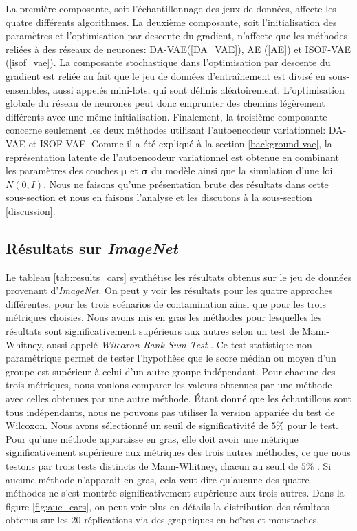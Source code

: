 La première composante, soit l'échantillonnage des jeux de données, affecte les quatre différents algorithmes. La deuxième composante, soit l'initialisation des paramètres et l'optimisation par descente du gradient, n'affecte que les méthodes reliées à des réseaux de neurones: DA-VAE(\ref{DA_VAE}), AE (\ref{AE}) et ISOF-VAE (\ref{isof_vae}). La composante stochastique dans l'optimisation par descente du gradient est reliée au fait que le jeu de données d'entraînement est divisé en sous-ensembles, aussi appelés mini-lots, qui sont définis aléatoirement. L'optimisation globale du réseau de neurones peut donc emprunter des chemins légèrement différents avec une même initialisation. Finalement, la troisième composante concerne seulement les deux méthodes utilisant l'autoencodeur variationnel: DA-VAE et ISOF-VAE. Comme il a été expliqué à la section \ref{background-vae}, la représentation latente de l'autoencodeur variationnel est obtenue en combinant les paramètres des couches $\boldsymbol{\mu}$ et $\boldsymbol{\sigma}$ du modèle ainsi que la simulation d'une loi $N(0,I)$. Nous ne faisons qu'une présentation brute des résultats dans cette sous-section et nous en faisons l'analyse et les discutons à la sous-section \ref{discussion}.
  

\subsection{Résultats sur \textit{ImageNet}} \label{results:imagenet}

Le tableau \ref{tab:results_cars} synthétise les résultats obtenus sur le jeu de données provenant d'\textit{ImageNet}. On peut y voir les résultats pour les quatre approches différentes, pour les trois scénarios de contamination ainsi que pour les trois métriques choisies. Nous avons mis en gras les méthodes pour lesquelles les résultats sont significativement supérieurs aux autres selon un test de Mann-Whitney, aussi appelé \textit{Wilcoxon Rank Sum Test} \citep{Mann47}. Ce test statistique non paramétrique permet de tester l'hypothèse que le score médian ou moyen d'un groupe est supérieur à celui d'un autre groupe indépendant. Pour chacune des trois métriques, nous voulons comparer les valeurs obtenues par une méthode avec celles obtenues par une autre méthode. Étant donné que les échantillons sont tous indépendants, nous ne pouvons pas utiliser la version appariée du test de Wilcoxon. Nous avons sélectionné un seuil de significativité de $5 \%$ pour le test. Pour qu'une méthode apparaisse en gras, elle doit avoir une métrique significativement supérieure aux métriques des trois autres méthodes, ce que nous testons par trois tests distincts de Mann-Whitney, chacun au seuil de $5 \%$ . Si aucune méthode n'apparait en gras, cela veut dire qu'aucune des quatre méthodes ne s'est montrée significativement supérieure aux trois autres. Dans la figure \ref{fig:auc_cars}, on peut voir plus en détails la distribution des résultats obtenus sur les 20 réplications via des graphiques en boîtes et moustaches.

